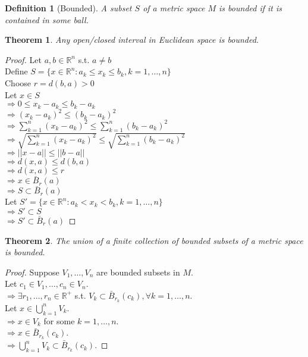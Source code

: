 \documentclass{article}
\newtheorem{definition}{Definition}[section]
\newtheorem{theorem}{Theorem}[section]
\begin{document}
			\begin{definition}[Bounded]
				\label{bounded}
				A subset $S$ of a metric space $M$ is bounded if it is contained in some ball.
			\end{definition}

			\begin{theorem}
				Any open/closed interval in Euclidean space is bounded.
			\end{theorem}
			\begin{proof}
				Let $a, b \in \mathbb{R}^n$ s.t. $a \neq b$\\
				Define $S = \{ x \in \mathbb{R}^n: a_k \leq x_k \leq b_k, k = 1, \ldots, n \}$\\
				Choose $r = d(b, a) > 0$\\
				Let $x \in S$\\
				$\Rightarrow 0 \leq x_k - a_k \leq b_k - a_k$\\
				$\Rightarrow (x_k - a_k)^2 \leq (b_k - a_k)^2$\\
				$\Rightarrow \sum \limits_{k=1}^n (x_k - a_k)^2 \leq \sum \limits_{k=1}^n (b_k - a_k)^2$\\
				$\Rightarrow \sqrt{\sum \limits_{k=1}^n (x_k - a_k)^2} \leq \sqrt{\sum \limits_{k=1}^n (b_k - a_k)^2}$\\
				$\Rightarrow ||x - a|| \leq ||b - a||$\\
				$\Rightarrow d(x, a) \leq d(b, a)$\\
				$\Rightarrow d(x, a) \leq r$\\
				$\Rightarrow x \in \bar{B}_r(a)$\\
				$\Rightarrow S \subset \bar{B}_r(a)$\\
				Let $S' = \{ x \in \mathbb{R}^n: a_k < x_k < b_k, k = 1, \ldots, n \}$\\
				$\Rightarrow S' \subset S$\\
				$\Rightarrow S' \subset \bar{B}_r(a)$
			\end{proof}

			\begin{theorem}
				The union of a finite collection of bounded subsets of a metric space is bounded.
			\end{theorem}
			\begin{proof}
				Suppose $V_1, \ldots, V_n$ are bounded subsets in $M$.\\
				Let $c_1 \in V_1, \ldots, c_n \in V_n$.\\
				$\Rightarrow \exists r_1, \ldots, r_n \in \mathbb{R}^+$ s.t. $V_{k} \subset \bar{B}_{r_k}(c_k), \forall k = 1, \ldots, n$.\\
				Let $x \in \bigcup_{k=1}^{n} V_k$.\\
				$\Rightarrow x \in V_k$ for some $k = 1, \ldots, n$.\\
				$\Rightarrow x \in \bar{B}_{r_k}(c_k)$.\\
				$\Rightarrow \bigcup_{k=1}^{n} V_k \subset  \bar{B}_{r_k}(c_k)$.
			\end{proof}
\end{document}
